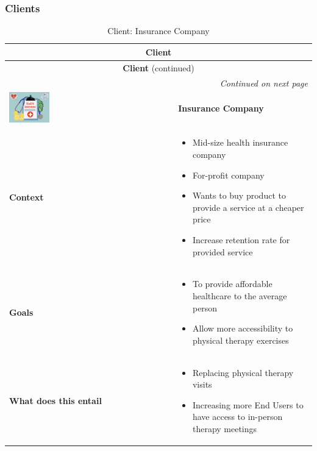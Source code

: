 \documentclass{article}
\begin{document}
\subsubsection{Clients}

\begin{longtable}{|p{}|p{}|}
    \caption{Client: Insurance Company} \label{table:client_insurance} \\
    \hline
    \multicolumn{2}{|c|}{\textbf{Client}} \\ 
    \hline
    \endfirsthead

    \hline
    \multicolumn{2}{|c|}{\textbf{Client} (continued)} \\ 
    \hline
    \endhead

    \hline
    \multicolumn{2}{|r|}{\textit{Continued on next page}} \\ 
    \hline
    \endfoot

    \hline
    \endlastfoot

    \includegraphics[width=0.25\textwidth]{insurance.jpeg} & \textbf{Insurance Company} \\ 
    \hline
    \textbf{Context} &
    \begin{itemize}[leftmargin=*]
        \item Mid-size health insurance company 
        \item For-profit company
        \item Wants to buy product to provide a service at a cheaper price
        \item Increase retention rate for provided service
    \end{itemize} \\
    \hline
    \textbf{Goals} &
    \begin{itemize}[leftmargin=*]
        \item To provide affordable healthcare to the average person
        \item Allow more accessibility to physical therapy exercises
    \end{itemize} \\
    \hline
    \textbf{What does this entail} &
    \begin{itemize}[leftmargin=*]
        \item Replacing physical therapy visits
        \item Increasing more End Users to have access to in-person therapy meetings
    \end{itemize} \\
    \hline
\end{longtable}
\end{document}
